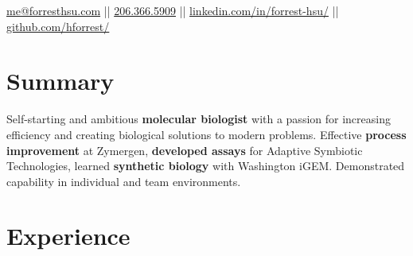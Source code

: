 \documentclass[]{forrest-resume-interfont}
\begin{document}
%
%

\lastupdated

%
%


%
%

{
	\href{mailto:me@forresthsu.com}{me@forresthsu.com} || 
	\href{tel:2063665909}{206.366.5909} || 
	\href{https://www.linkedin.com/in/forrest-hsu/}{linkedin.com/in/forrest-hsu/} ||
	\href{https://github.com/HForrest/}{github.com/hforrest/}
}

%
%
\spacesep
\section{ Summary}
\raggedright 

Self-starting and ambitious \textbf{molecular biologist} with a passion for increasing efficiency and  creating biological solutions to modern problems. Effective \textbf{process improvement} at Zymergen, \textbf{developed assays} for Adaptive Symbiotic Technologies, learned \textbf{synthetic biology} with Washington iGEM. Demonstrated capability in individual and team environments.

\spacesep
\linesep



\section{ Experience}
\spacesep
{} 
\\
\end{document}

